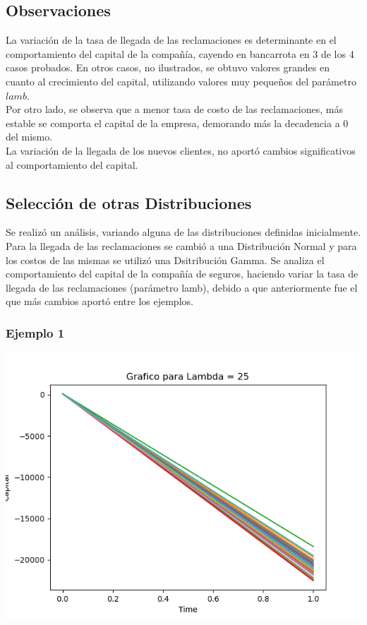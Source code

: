 \documentclass{article}
\begin{document}
\subsection{Observaciones}
La variación de la tasa de llegada de las reclamaciones es determinante en el comportamiento del capital de la compañía, cayendo en bancarrota en 3 de los 4 casos probados. En otros casos, no ilustrados, se obtuvo valores grandes en cuanto al crecimiento del capital, utilizando valores muy pequeños del parámetro $lamb$. \\
Por otro lado, se observa que a menor tasa de costo de las reclamaciones, más estable se comporta el capital de la empresa, demorando más la decadencia a 0 del mismo. \\
La variación de la llegada de los nuevos clientes, no aportó cambios significativos al comportamiento del capital. \\

\subsection{Selección de otras Distribuciones}
Se realizó un análisis, variando alguna de las distribuciones definidas inicialmente. 
Para la llegada de las reclamaciones se cambió a una Distribución Normal y para los costos de las mismas se utilizó una Dsitribución Gamma. 
Se analiza el comportamiento del capital de la compañía de seguros, haciendo variar la tasa de llegada de las reclamaciones (parámetro lamb), debido a que anteriormente fue el que más cambios aportó entre los ejemplos. 

\subsubsection{Ejemplo 1}
\includegraphics[scale = 0.8]{dis1.png}
\end{document}

